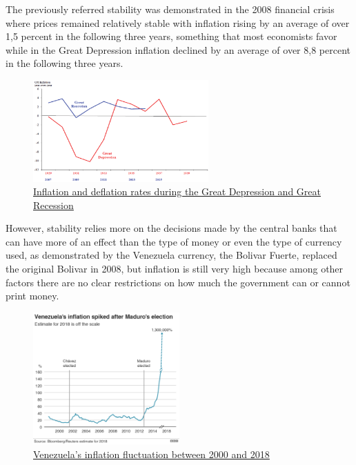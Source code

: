 \documentclass{article}
\begin{document}
The previously referred stability was demonstrated in the 2008 financial crisis where prices remained relatively stable with inflation rising by an average of over 1,5 percent in the following three years, something that most economists favor while in the Great Depression inflation declined by an average of over 8,8 percent in the following three years.

\begin{figure}[H]
    \begin{center}
        \includegraphics[width=0.6\textwidth]{images/inflation_deflation.png}
        \caption{\href{https://www.researchgate.net/figure/Inflation-and-deflation-rates-during-the-Great-Depression-and-Great-Recession_fig3_321576621}{\underline{Inflation and deflation rates during the Great Depression and Great Recession}}}
    \end{center}
\end{figure}


However, stability relies more on the decisions made by the central banks that can have more of an effect than the type of money or even the type of currency used, as demonstrated by the Venezuela currency, the Bolivar Fuerte, replaced the original Bolivar in 2008, but inflation is still very high because among other factors there are no clear restrictions on how much the government can or cannot print money.

\begin{figure}[H]
    \begin{center}
        \includegraphics[width=0.5\textwidth]{images/venezuela_inflation.png}
        \caption{\href{https://ichef.bbci.co.uk/news/640/cpsprodpb/7822/production/_105345703_venezuela-inflation_v3_976-nc.png}{\underline{Venezuela's inflation fluctuation between 2000 and 2018}}}
    \end{center}
\end{figure}
\end{document}
